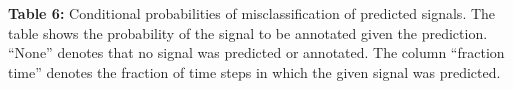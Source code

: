 \documentclass[11pt]{article}
\begin{document}
\begin{table}[h]
    \centering
    \caption*{\textbf{Table 6:} Conditional probabilities of misclassification of predicted signals. The table shows the probability of the signal to be annotated given the prediction. “None” denotes that no signal was predicted or annotated. The column “fraction time” denotes the fraction of time steps in which the given signal was predicted.}
    \small
    
\end{table}
\end{document}
